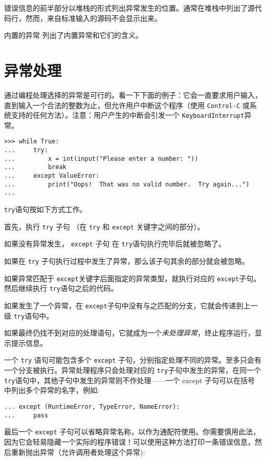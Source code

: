 错误信息的前半部分以堆栈的形式列出异常发生的位置。通常在堆栈中列出了源代码行，然而，来自标准输入的源码不会显示出来。

内置的异常 列出了内置异常和它们的含义。
\section{异常处理\label{ErrorException:HandleException}}
通过编程处理选择的异常是可行的。看一下下面的例子：它会一直要求用户输入，直到输入一个合法的整数为止，但允许用户中断这个程序（使用 \texttt{Control-C} 或系统支持的任何方法）。注意：用户产生的中断会引发一个 \texttt{KeyboardInterrupt}异常。
\begin{lstlisting}
>>> while True:
...     try:
...         x = int(input("Please enter a number: "))
...         break
...     except ValueError:
...         print("Oops!  That was no valid number.  Try again...")
...
\end{lstlisting}
\texttt{try}语句按如下方式工作。
\begin{compactitem}
    \item 首先，执行 \texttt{try} 子句 （在 \texttt{try} 和 \texttt{except} 关键字之间的部分）。
    \item 如果没有异常发生， \texttt{except} 子句 在 \texttt{try}语句执行完毕后就被忽略了。
    \item 如果在 \texttt{try} 子句执行过程中发生了异常，那么该子句其余的部分就会被忽略。

    如果异常匹配于 \texttt{except}关键字后面指定的异常类型，就执行对应的 \texttt{except}子句。然后继续执行 \texttt{try}语句之后的代码。
    \item 如果发生了一个异常，在 \texttt{except}子句中没有与之匹配的分支，它就会传递到上一级 \texttt{try}语句中。

    如果最终仍找不到对应的处理语句，它就成为一个\textit{未处理异常}，终止程序运行，显示提示信息。
\end{compactitem}
一个 \texttt{try} 语句可能包含多个 \texttt{except} 子句，分别指定处理不同的异常。至多只会有一个分支被执行。异常处理程序只会处理对应的 \texttt{try}子句中发生的异常，在同一个 \texttt{try}语句中，其他子句中发生的异常则不作处理——一个 except 子句可以在括号中列出多个异常的名字，例如:
\begin{lstlisting}
... except (RuntimeError, TypeError, NameError):
...     pass
\end{lstlisting}
最后一个 \texttt{except} 子句可以省略异常名称，以作为通配符使用。你需要慎用此法，因为它会轻易隐藏一个实际的程序错误！可以使用这种方法打印一条错误信息，然后重新抛出异常（允许调用者处理这个异常):
